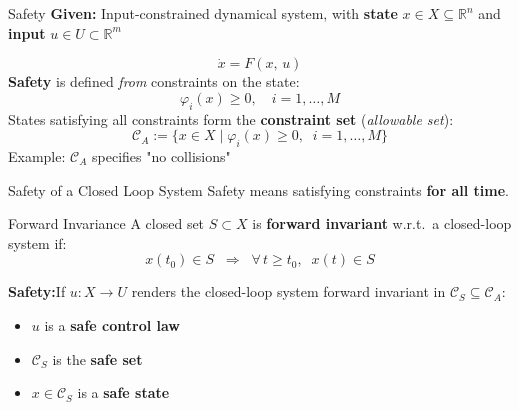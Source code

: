 \begin{frame}{Safety}
  \small
  \textbf{Given:} Input-constrained dynamical system, with \textbf{state} $x \in X \subseteq \mathbb{R}^n$
  and \textbf{input} $u \in U \subset \mathbb{R}^m$

  \vskip-8pt
  \[ \dot{x} = F(x,\, u) \]
  \vskip2pt
  \textbf{Safety} is defined  \textit{from}  constraints on the state:
  \vskip-4pt
  \[ \varphi_i(x) \geq 0, \quad i = 1, \ldots, M \]
  \vskip2pt
  States satisfying all constraints form the \textbf{constraint set} (\textit{allowable set}):
  \vskip-4pt
  \[ \mathcal{C}_A := \{x \in X \mid \varphi_i(x) \geq 0, \;\; i = 1, \ldots, M\} \]
  \vskip4pt
  Example: $\mathcal{C}_A$ specifies "no collisions"
  \vskip4pt
\end{frame}

\begin{frame}{Safety of a Closed Loop System}
  \small
  Safety means satisfying constraints \textbf{for all time}.

  \vskip6pt
  \begin{block}{Forward Invariance}
    \vskip2pt
    A closed set $S \subset X$ is \textbf{forward invariant} w.r.t.\ a closed-loop system if:
    \vskip-6pt
    \[ x(t_0) \in S \;\;\Rightarrow\;\; \forall\, t \geq t_0,\;\; x(t) \in S \]
    \vspace{-10pt}
  \end{block}

  \vskip4pt
  \textbf{Safety:}\quad If $u: X \to U$ renders the closed-loop system forward invariant in $\mathcal{C}_S \subseteq \mathcal{C}_A$:
  \vskip4pt
  \begin{itemize}
    \item $u$ is a \textbf{safe control law}
    \item $\mathcal{C}_S$ is the \textbf{safe set}
    \item $x \in \mathcal{C}_S$ is a \textbf{safe state}
  \end{itemize}
\end{frame}

